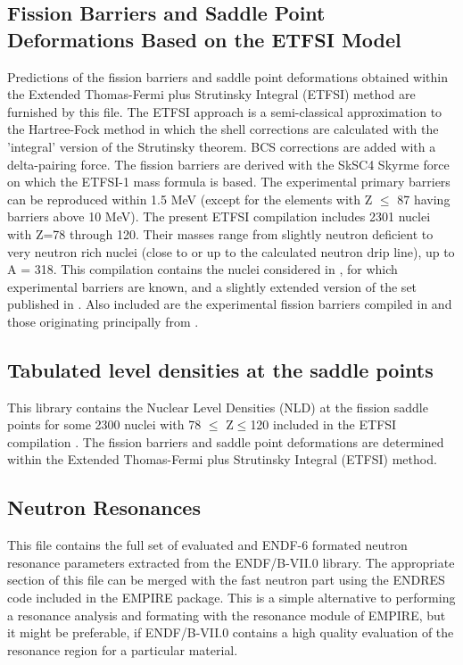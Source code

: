 \subsection{Fission Barriers and Saddle Point Deformations Based on the
ETFSI Model}

Predictions of the fission barriers and saddle point deformations obtained
within the Extended Thomas-Fermi plus Strutinsky Integral (ETFSI)
method are furnished by this file.
The ETFSI approach is a semi-classical approximation to the Hartree-Fock
method in which the shell corrections are calculated with the 'integral'
version of the Strutinsky theorem. BCS corrections are added with a
delta-pairing force. The fission barriers are derived with the SkSC4 Skyrme
force on which the ETFSI-1 mass formula is based. The experimental primary
barriers can be reproduced within 1.5 MeV (except for the elements with Z $%
\le$ 87 having barriers above 10 MeV). The present ETFSI compilation
includes 2301 nuclei with Z=78 through 120. Their masses range from slightly
neutron deficient to very neutron rich nuclei (close to or up to the
calculated neutron drip line), up to A = 318. This compilation contains the
nuclei considered in \cite{Mamdouh1998}, for which experimental barriers are
known, and a slightly extended version of the set published in \cite%
{Mamdouh(2001)}. Also included are the experimental fission barriers
compiled in \cite{Mamdouh1998} and those originating principally from \cite%
{Smirenkin1993}.

\subsection{Tabulated level densities at the saddle points}

This library contains the Nuclear Level Densities (NLD) at the
fission saddle points for some 2300 nuclei
with 78 $\le$ Z$\le$120 included in the ETFSI compilation \cite%
{Mamdouh(2001)}.
The fission barriers and saddle point deformations are
determined within the Extended Thomas-Fermi plus Strutinsky Integral (ETFSI)
method.

\subsection{Neutron Resonances}

This file contains the full set of evaluated and ENDF-6 formated neutron
resonance parameters extracted from the ENDF/B-VII.0 library. The
appropriate section of this file can be merged with the fast neutron part
using the ENDRES code included in the EMPIRE package. This is a simple
alternative to performing a resonance analysis and formating with the
resonance module of EMPIRE, but it might be preferable, if ENDF/B-VII.0
contains a high quality evaluation of the resonance region for a particular
material.

